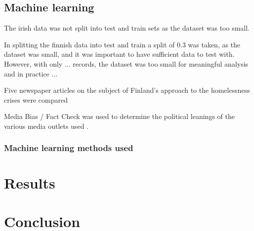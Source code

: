 \documentclass[hidelinks,12pt,oneside]{report} %
\begin{document}
\section{Machine learning}
The irish data was not split into test and train sets as the dataset was too small.

In splitting the finnish data into test and train a split of 0.3 was taken, as the dataset was small, and it was important to have sufficient data to test with. However, with only ... records, the dataset was too small for meaningful analysis and in practice ...

Five newspaper articles on the subject of Finland's approach to the homelessness crises were compared

Media Bias / Fact Check was used to determine the political leanings of the various media outlets used \citep{bias}.

\subsection{Machine learning methods used}

\chapter{Results}

\chapter{Conclusion}


\printbibliography
 
\end{document}

